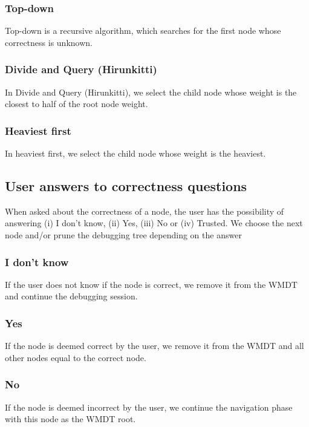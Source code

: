 \subsubsection{Top-down}
Top-down is a recursive algorithm, which searches for the first node whose correctness is unknown.

\subsubsection{Divide and Query (Hirunkitti)}
In Divide and Query (Hirunkitti), we select the child node whose weight is the closest to half of the root node weight.

\subsubsection{Heaviest first}
In heaviest first, we select the child node whose weight is the heaviest.

\subsection{User answers to correctness questions}
\label{implementation:correctnessAnswers}
When asked about the correctness of a node, the user has the possibility of answering (i) I don't know, (ii) Yes, (iii) No or (iv) Trusted.
We choose the next node and/or prune the debugging tree depending on the answer
\subsubsection{I don't know}
If the user does not know if the node is correct, we remove it from the WMDT and continue the debugging session.
\subsubsection{Yes}
If the node is deemed correct by the user, we remove it from the WMDT and all other nodes equal to the correct node.

\subsubsection{No}
If the node is deemed incorrect by the user, we continue the navigation phase with this node as the WMDT root.
